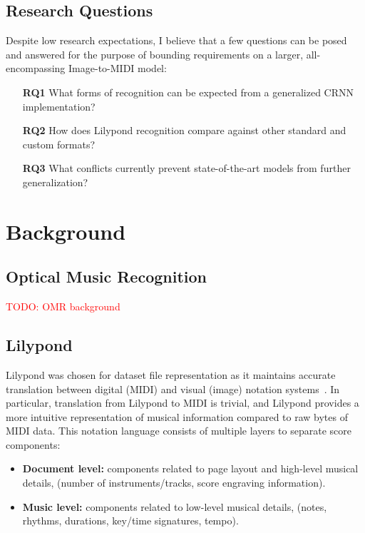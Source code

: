 \documentclass[review,sigconf]{acmart}
\newcommand{\todo}[1]{\textcolor{red}{TODO: #1}}
\begin{document}
\subsection{Research Questions}

Despite low research expectations, I believe that a few questions can be posed and answered for the purpose of bounding requirements on a larger, all-encompassing Image-to-MIDI model:

\begin{itemize}
	\item [\textbf{RQ1}] What forms of recognition can be expected from a generalized CRNN implementation?
	\item [\textbf{RQ2}] How does Lilypond recognition compare against other standard and custom formats?
	\item [\textbf{RQ3}] What conflicts currently prevent state-of-the-art models from further generalization?
\end{itemize}


\section{Background}
\subsection{Optical Music Recognition}
\todo{OMR background}

\subsection{Lilypond}
Lilypond was chosen for dataset file representation as it maintains accurate translation between digital (MIDI) and visual (image) notation systems~\cite{lilypond}.
In particular, translation from Lilypond to MIDI is trivial, and Lilypond provides a more intuitive representation of musical information compared to raw bytes of MIDI data.
This notation language consists of multiple layers to separate score components:

\begin{itemize}
		\item \textbf{Document level:} components related to page layout and high-level musical details, (number of instruments/tracks, score engraving information).
		\item \textbf{Music level:} components related to low-level musical details, (notes, rhythms, durations, key/time signatures, tempo).
\end{itemize}
\end{document}
